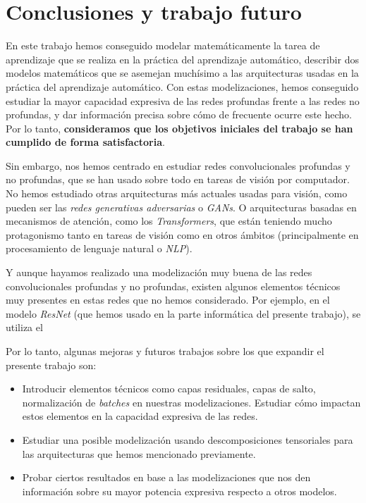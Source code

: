 \chapter{Conclusiones y trabajo futuro} \label{chapter:conclusiones_trabajo_futuro}

En este trabajo hemos conseguido modelar matemáticamente la tarea de aprendizaje que se realiza en la práctica del aprendizaje automático, describir dos modelos matemáticos que se asemejan muchísimo a las arquitecturas usadas en la práctica del aprendizaje automático. Con estas modelizaciones, hemos conseguido estudiar la mayor capacidad expresiva de las redes profundas frente a las redes no profundas, y dar información precisa sobre cómo de frecuente ocurre este hecho. Por lo tanto, \textbf{consideramos que los objetivos iniciales del trabajo se han cumplido de forma satisfactoria}.

Sin embargo, nos hemos centrado en estudiar redes convolucionales profundas y no profundas, que se han usado sobre todo en tareas de visión por computador. No hemos estudiado otras arquitecturas más actuales usadas para visión, como pueden ser las \textit{redes generativas adversarias} o \textit{GANs}. O arquitecturas basadas en mecanismos de atención, como los \textit{Transformers}, que están teniendo mucho protagonismo tanto en tareas de visión como en otros ámbitos (principalmente en procesamiento de lenguaje natural o \textit{NLP}).

Y aunque hayamos realizado una modelización muy buena de las redes convolucionales profundas y no profundas, existen algunos elementos técnicos muy presentes en estas redes que no hemos considerado. Por ejemplo, en el modelo \textit{ResNet} (que hemos usado en la parte informática del presente trabajo), se utiliza el 

Por lo tanto, algunas mejoras y futuros trabajos sobre los que expandir el presente trabajo son:

\begin{itemize}
	\item Introducir elementos técnicos como capas residuales, capas de salto, normalización de \textit{batches} en nuestras modelizaciones. Estudiar cómo impactan estos elementos en la capacidad expresiva de las redes.
	\item Estudiar una posible modelización usando descomposiciones tensoriales para las arquitecturas que hemos mencionado previamente.
	\item Probar ciertos resultados en base a las modelizaciones que nos den información sobre su mayor potencia expresiva respecto a otros modelos.
\end{itemize}
